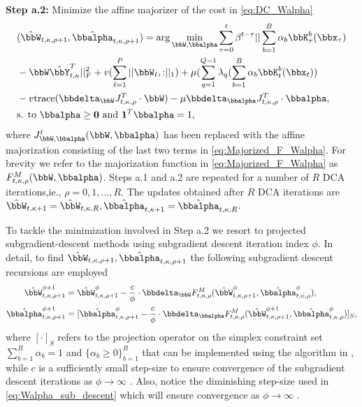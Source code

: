 \documentclass[10pt,final]{IEEEtran}
\begin{document}
\textbf{Step a.2:} Minimize the affine majorizer of the cost  in \eqref{eq:DC_Walpha}
\begin{align}\label{eq:Majorized_F_Walpha}
&(\hat{\bbW}_{t,\kappa,\rho+1},\hat{\bbalpha}_{t,\kappa,\rho+1})  
=    \arg\min_{\bbW,\bbalpha}
\sum_{\tau=0}^{t}\beta^{t-\tau}||\sum_{b=1}^{B}\alpha_b \bbK_{\tau}^b(\bbx_{\tau})\nonumber\\
&-\bbW\hat{\bbY}_{t,\kappa}^T||_F^2
+v(\sum_{\ell=1}^{P}||{\bbW_{\ell},:}||_1)+\mu(\sum_{q=1}^{Q-1}\lambda_q(\sum_{b=1}^{B}\alpha_b \bbK_{t}^b(\bbx_{t}))\\
&- v\textrm{trace}(\bbdelta_{\bbW} J_{t,\kappa,\rho}^T\cdot \bbW)
-\mu\bbdelta_{\bbalpha} J_{t,\kappa,\rho}^T\cdot\bbalpha\nonumber,\\
&\textrm{s. to }\bbalpha\geq \mathbf{0}\textrm{ and }\mathbf{1}^T\bbalpha=1,
\end{align}
where $J_{\bbW,\bbalpha}^t(\bbW,\bbalpha)$ has been replaced with the affine majorization consisting of the last two terms in \eqref{eq:Majorized_F_Walpha}. For brevity we refer to the majorization function in \eqref{eq:Majorized_F_Walpha} as $F_{t,\kappa,\rho}^M(\bbW,\bbalpha)$. Steps a.1 and a.2 are repeated for a number of $R$ DCA iterations,ie., $\rho=0,1,\ldots,R$. %
The updates obtained after $R$ DCA iterations are 
$\hat{\bbW}_{t,\kappa+1}=\hat{\bbW}_{t,\kappa,R},\hat{\bbalpha}_{t,\kappa+1}=\hat{\bbalpha}_{t,\kappa,R}$.

To tackle the minimization involved in Step a.2 we resort to projected subgradient-descent methods \cite{subgradient methods} using subgradient descent iteration index $\phi$. In detail, to find 
$\hat{\bbW}_{t,\kappa,\rho+1},\hat{\bbalpha}_{t,\kappa,\rho+1}$  the following subgradient descent recursions are employed
\begin{align}\label{eq:Walpha_sub_descent}
 \hspace{-2cm} \hat{\bbW}_{t,\kappa,\rho+1}^{\phi+1}&=
  \hat{\bbW}_{t,\kappa,\rho+1}^{\phi}-\frac{c}{\phi}\cdot \bbdelta_{\bbW}F_{t,\kappa,\rho}^M(\hat{\bbW}_{t,\kappa,\rho+1}^{\phi},\hat{\bbalpha}_{t,\kappa,\rho}^{\phi}), \\
  \hat{\bbalpha}_{t,\kappa,\rho+1}^{\phi+1}&= [\hat{\bbalpha}_{t,\kappa,\rho+1}^{\phi}-\frac{c}{\phi}\cdot \bbdelta_{\bbalpha}F_{t,\kappa,\rho}^M(\hat{\bbW}_{t,\kappa,\rho+1}^{\phi+1},\hat{\bbalpha}_{t,\kappa,\rho}^{\phi})]_{S},\nonumber
\end{align}
where $[\cdot]_S$ refers to the projection operator on the simplex constraint set $\sum_{b=1}^B\alpha_b=1$ and $\{\alpha_b\geq 0\}_{b=1}^B$ that can be implemented using the algorithm in \cite{Simplex}, while $c$ is a sufficiently small step-size to ensure convergence of the subgradient descent iterations as $\phi\rightarrow\infty$ \cite{subgradient methods}. Also, notice the diminishing step-size used in \eqref{eq:Walpha_sub_descent} which will ensure convergence as $\phi\rightarrow\infty$ \cite{subgradient methods}.
\end{document}
